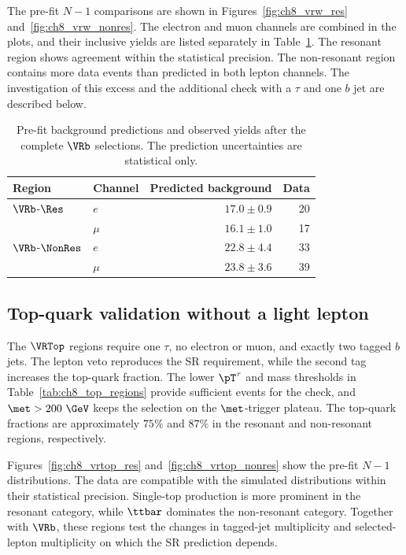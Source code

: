 The pre-fit $N-1$ comparisons are shown in Figures~\ref{fig:ch8_vrw_res} and~\ref{fig:ch8_vrw_nonres}.
The electron and muon channels are combined in the plots, and their inclusive yields are listed separately in Table~\ref{tab:ch8_vrw_prefit}.
The resonant region shows agreement within the statistical precision.
The non-resonant region contains more data events than predicted in both lepton channels.
The investigation of this excess and the additional check with a $\tau$ and one $b$ jet are described below.

\begin{table}[htbp]
    \centering
    \small
    \caption{Pre-fit background predictions and observed yields after the complete $\VRb$ selections. The prediction uncertainties are statistical only.}
    \label{tab:ch8_vrw_prefit}
    \begin{tabular}{llrr}
        \toprule
        Region & Channel & Predicted background & Data \\
        \midrule
        $\VRb$-$\Res$ & $e$ & $17.0\pm0.9$ & 20 \\
         & $\mu$ & $16.1\pm1.0$ & 17 \\
        $\VRb$-$\NonRes$ & $e$ & $22.8\pm4.4$ & 33 \\
         & $\mu$ & $23.8\pm3.6$ & 39 \\
        \bottomrule
    \end{tabular}
\end{table}


\clearpage
\subsection[Top-quark validation without a light lepton]{Top-quark validation without a light lepton}
\label{subsec:ch8_vrtop}

The $\VRTop$ regions require one $\tau$, no electron or muon, and exactly two tagged $b$ jets.
The lepton veto reproduces the SR requirement, while the second tag increases the top-quark fraction.
The lower $\pT^\tau$ and mass thresholds in Table~\ref{tab:ch8_top_regions} provide sufficient events for the check, and $\met>200~\GeV$ keeps the selection on the $\met$-trigger plateau.
The top-quark fractions are approximately $75\%$ and $87\%$ in the resonant and non-resonant regions, respectively.

Figures~\ref{fig:ch8_vrtop_res} and~\ref{fig:ch8_vrtop_nonres} show the pre-fit $N-1$ distributions.
The data are compatible with the simulated distributions within their statistical precision.
Single-top production is more prominent in the resonant category, while $\ttbar$ dominates the non-resonant category.
Together with $\VRb$, these regions test the changes in tagged-jet multiplicity and selected-lepton multiplicity on which the SR prediction depends.

